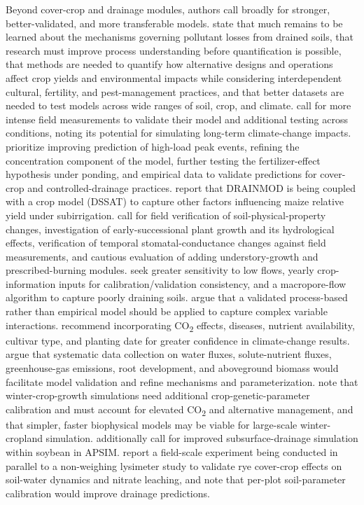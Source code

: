 \documentclass[11pt]{article}
\begin{document}
Beyond cover-crop and drainage modules, authors call broadly for stronger, better-validated, and more transferable models. \textcite{SKAGGS1994} state that much remains to be learned about the mechanisms governing pollutant losses from drained soils, that research must improve process understanding before quantification is possible, that methods are needed to quantify how alternative designs and operations affect crop yields and environmental impacts while considering interdependent cultural, fertility, and pest-management practices, and that better datasets are needed to test models across wide ranges of soil, crop, and climate. \textcite{Negm2014} call for more intense field measurements to validate their model and additional testing across conditions, noting its potential for simulating long-term climate-change impacts. \textcite{Grewal2025} prioritize improving prediction of high-load peak events, refining the concentration component of the model, further testing the fertilizer-effect hypothesis under ponding, and empirical data to validate predictions for cover-crop and controlled-drainage practices. \textcite{Gunn2018} report that DRAINMOD is being coupled with a crop model (DSSAT) to capture other factors influencing maize relative yield under subirrigation. \textcite{Tian2012} call for field verification of soil-physical-property changes, investigation of early-successional plant growth and its hydrological effects, verification of temporal stomatal-conductance changes against field measurements, and cautious evaluation of adding understory-growth and prescribed-burning modules. \textcite{Morrison2014} seek greater sensitivity to low flows, yearly crop-information inputs for calibration/validation consistency, and a macropore-flow algorithm to capture poorly draining soils. \textcite{Smith2008} argue that a validated process-based rather than empirical model should be applied to capture complex variable interactions. \textcite{Ndulue2024} recommend incorporating CO\textsubscript{2} effects, diseases, nutrient availability, cultivar type, and planting date for greater confidence in climate-change results. \textcite{Ma2025} argue that systematic data collection on water fluxes, solute-nutrient fluxes, greenhouse-gas emissions, root development, and aboveground biomass would facilitate model validation and refine mechanisms and parameterization. \textcite{Li2025} note that winter-crop-growth simulations need additional crop-genetic-parameter calibration and must account for elevated CO\textsubscript{2} and alternative management, and that simpler, faster biophysical models may be viable for large-scale winter-cropland simulation. \textcite{Dietzel2016} additionally call for improved subsurface-drainage simulation within soybean in APSIM. \textcite{Qi2010b} report a field-scale experiment being conducted in parallel to a non-weighing lysimeter study to validate rye cover-crop effects on soil-water dynamics and nitrate leaching, and \textcite{Malone2007c} note that per-plot soil-parameter calibration would improve drainage predictions.
\end{document}
